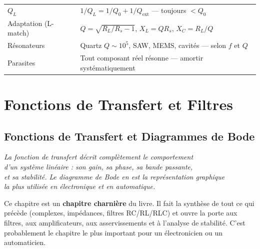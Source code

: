 \documentclass[12pt,a4paper,twoside]{book}
\begin{document}
\begin{ingenieur}[title={\color{white} Résumé --- Niveau Ingénieur}]
\begin{center}
\renewcommand{\arraystretch}{1.3}
\begin{tabular}{p{4cm}p{9cm}}
\toprule
$Q_L$ & $1/Q_L = 1/Q_0 + 1/Q_{\text{ext}}$ --- toujours $< Q_0$ \\
Adaptation (L-match) & $Q = \sqrt{R_L/R_s - 1}$, $X_L = QR_s$, $X_C = R_L/Q$ \\
Résonateurs & Quartz $Q\sim10^5$, SAW, MEMS, cavités --- selon $f$ et $Q$ \\
Parasites & Tout composant réel résonne --- amortir systématiquement \\
\bottomrule
\end{tabular}
\end{center}
\end{ingenieur}


\part{Fonctions de Transfert et Filtres}

\chapter{Fonctions de Transfert et Diagrammes de Bode}

\begin{center}
\textit{La fonction de transfert décrit complètement le comportement\\
d'un système linéaire : son gain, sa phase, sa bande passante,\\
et sa stabilité. Le diagramme de Bode en est la représentation graphique\\
la plus utilisée en électronique et en automatique.}
\end{center}

\vspace{0.5cm}

Ce chapitre est un \textbf{chapitre charnière} du livre. Il fait la synthèse de tout ce qui précède (complexes, impédances, filtres RC/RL/RLC) et ouvre la porte aux filtres, aux amplificateurs, aux asservissements et à l'analyse de stabilité. C'est probablement le chapitre le plus important pour un électronicien ou un automaticien.
\end{document}
